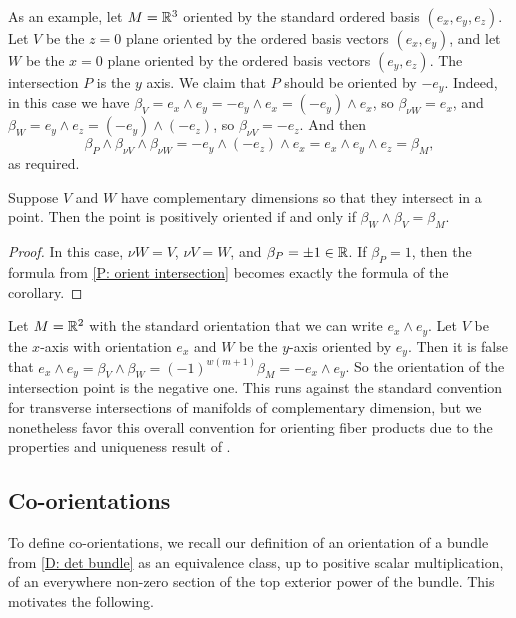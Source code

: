 \begin{example}
	As an example, let $M=\mathbb{R}^3$ oriented by the standard ordered basis $(e_x,e_y,e_z)$.
	Let $V$ be the $z=0$ plane oriented by the ordered basis vectors $(e_x,e_y)$, and let $W$ be the $x=0$ plane oriented by the ordered basis vectors $(e_y,e_z)$.
	The intersection $P$ is the $y$ axis.
	We claim that $P$ should be oriented by $-e_y$.
	Indeed, in this case we have $\beta_V=e_x\wedge e_y=-e_y\wedge e_x=(-e_y)\wedge e_x$, so $\beta_{\nu W}=e_x$, and $\beta_W=e_y\wedge e_z=(-e_y)\wedge (-e_z)$, so $\beta_{\nu V}=-e_z$.
	And then $$\beta_P\wedge \beta_{\nu V}\wedge \beta_{\nu W}=-e_y\wedge (-e_z)\wedge e_x=e_x\wedge e_y\wedge e_z=\beta_M,$$
	as required.
\end{example}

\begin{corollary}\label{C: orient complementary intersection}
	Suppose $V$ and $W$ have complementary dimensions so that they intersect in a point.
	Then the point is positively oriented if and only if $\beta_{W}\wedge \beta_{V}=\beta_M$.
\end{corollary}

\begin{proof}
	In this case, $\nu W=V$, $\nu V=W$, and $\beta_P=\pm 1\in \mathbb{R}$.
	If $\beta_P=1$, then the formula from \cref{P: orient intersection} becomes exactly the formula of the corollary.
\end{proof}

\begin{example}
	Let $M=\mathbb{R}^2$ with the standard orientation that we can write $e_x\wedge e_y$.
	Let $V$ be the $x$-axis with orientation $e_x$ and $W$ be the $y$-axis oriented by $e_y$.
	Then it is false that $e_x\wedge e_y=\beta_{V}\wedge \beta_{W}=(-1)^{w(m+1)}\beta_M=-e_x\wedge e_y$.
	So the orientation of the intersection point is the negative one.
	This runs against the standard convention for transverse intersections of manifolds of complementary dimension, but we nonetheless favor this overall convention for orienting fiber products due to the properties and uniqueness result of \cite{RamBas09}.
\end{example}

\subsection{Co-orientations}\label{S: co-orientations}

To define co-orientations, we recall our definition of an orientation of a bundle from \cref{D: det bundle} as an equivalence class, up to positive scalar multiplication,
of an everywhere non-zero section of the top exterior power of the bundle.
This motivates the following.


